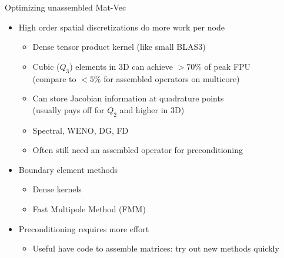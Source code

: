 \begin{frame}{Optimizing unassembled Mat-Vec}
  \begin{itemize}
  \item High order spatial discretizations do more work per node
    \begin{itemize}
    \item Dense tensor product kernel (like small BLAS3)
    \item Cubic ($Q_3$) elements in 3D can achieve $>70\%$ of peak FPU \\
      (compare to $< 5\%$ for assembled operators on multicore)
    \item Can store Jacobian information at quadrature points \\
      (usually pays off for $Q_2$ and higher in 3D)
    \item Spectral, WENO, DG, FD
    \item Often still need an assembled operator for preconditioning
    \end{itemize}
  \item Boundary element methods
    \begin{itemize}
    \item Dense kernels
    \item Fast Multipole Method (FMM)
    \end{itemize}
  \item<2> \alert{Preconditioning requires more effort}
    \begin{itemize}
    \item Useful have code to assemble matrices: try out new methods quickly
    \end{itemize}
  \end{itemize}
\end{frame}
